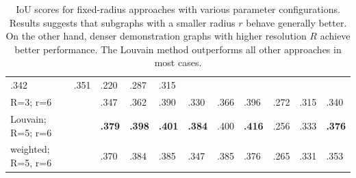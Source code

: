 \documentclass{beamer}
\theoremstyle{definition}
\theoremstyle{plain}
\theoremstyle{Remark}
\begin{document}
\begin{frame}
\begin{table}
{\begin{tabular}{|l|l|lll|lll|lll|}
					\multicolumn{1}{l|}{.342} &
					.351 &
					\multicolumn{1}{l|}{.220} &
					\multicolumn{1}{l|}{.287} &
					.315 \\ \cline{1-1} \cline{3-11} 
					R=3; r=6 &
					&
					\multicolumn{1}{l|}{.347} &
					\multicolumn{1}{l|}{.362} &
					.390 &
					\multicolumn{1}{l|}{.330} &
					\multicolumn{1}{l|}{.366} &
					.396 &
					\multicolumn{1}{l|}{.272} &
					\multicolumn{1}{l|}{.315} &
					.340 \\ \cline{1-1} \cline{3-11} 
					Louvain; R=5; r=6 &
					&
					\multicolumn{1}{l|}{\textbf{.379}} &
					\multicolumn{1}{l|}{\textbf{.398}} &
					\textbf{.401} &
					\multicolumn{1}{l|}{\textbf{.384}} &
					\multicolumn{1}{l|}{.400} &
					\textbf{.416} &
					\multicolumn{1}{l|}{.256} &
					\multicolumn{1}{l|}{.333} &
					\textbf{.376} \\ \cline{1-1} \cline{3-11} 
					weighted; R=5, r=6 &
					&
					\multicolumn{1}{l|}{.370} &
					\multicolumn{1}{l|}{.384} &
					.385 &
					\multicolumn{1}{l|}{.347} &
					\multicolumn{1}{l|}{.385} &
					.376 &
					\multicolumn{1}{l|}{.265} &
					\multicolumn{1}{l|}{.331} &
					.353 \\ \cline{1-1} \cline{3-11}
				\end{tabular}%
			}
			\caption{IoU scores for fixed-radius approaches with various parameter configurations. Results suggests that subgraphs with a smaller radius $r$ behave generally better. On the other hand, denser demonstration graphs with higher resolution $R$ achieve better performance. The Louvain method outperforms all other approaches in most cases.}
			\label{iou fixed}
			\end{table}
	\end{frame}
	
\end{document}
